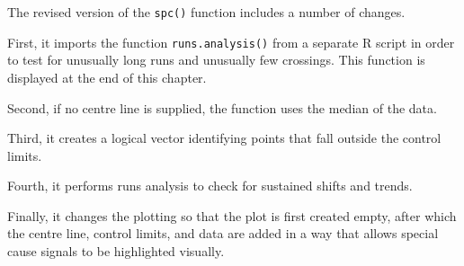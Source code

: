 \documentclass[
]{book}
\begin{document}
The revised version of the \texttt{spc()} function includes a number of
changes.

First, it imports the function \texttt{runs.analysis()} from a separate
R script in order to test for unusually long runs and unusually few
crossings. This function is displayed at the end of this chapter.

Second, if no centre line is supplied, the function uses the median of
the data.

Third, it creates a logical vector identifying points that fall outside
the control limits.

Fourth, it performs runs analysis to check for sustained shifts and
trends.

Finally, it changes the plotting so that the plot is first created
empty, after which the centre line, control limits, and data are added
in a way that allows special cause signals to be highlighted visually.
\end{document}
